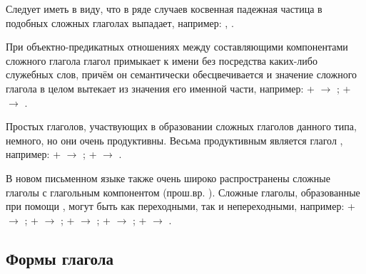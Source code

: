 Следует иметь в виду, что в ряде случаев косвенная падежная частица в подобных сложных глаголах выпадает, например:
,
.

При объектно-предикатных отношениях между составляющими компонентами сложного глагола глагол примыкает к имени без посредства каких-либо служебных слов, причём он семантически обесцвечивается и значение сложного глагола в целом вытекает из значения его именной части, например:
 +  $\rightarrow$ ;
 +  $\rightarrow$ .

Простых глаголов, участвующих в образовании сложных глаголов данного типа, немного, но они очень продуктивны. Весьма продуктивным является глагол , например:
 +  $\rightarrow$ ;
 +  $\rightarrow$ .

В новом письменном языке также очень широко распространены сложные глаголы с глагольным компонентом  (прош.вр. ). Сложные глаголы, образованные при помощи , могут быть как переходными, так и непереходными, например:
 +  $\rightarrow$ ;
 +  $\rightarrow$ ;
 +  $\rightarrow$ ;
 +  $\rightarrow$ ;
 +  $\rightarrow$ .

\subsection{Формы глагола}


